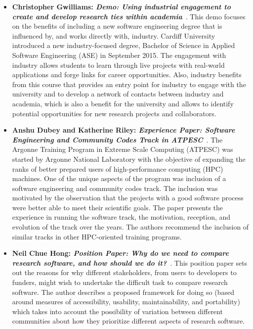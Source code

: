 \documentclass[11pt, oneside]{amsart}
\begin{document}
\begin{itemize}
\item \textbf{Christopher Gwilliams: \emph{Demo: Using industrial engagement to
create and develop research ties within academia}}~\cite{Gwilliams:2016ws}.
This demo focuses on the benefits of including a  new  software engineering
degree that is influenced by, and works directly with,
industry.  Cardiff  University  introduced  a  new  industry-focused  degree,
Bachelor of Science in Applied Software Engineering (ASE) in September
2015. The engagement with industry allows students to learn through live
projects  with  real-world  applications and forge links for career opportunities.
Also, industry benefits from this course that provides an entry point for industry
to engage with the university and to develop a network of contacts between industry
and academia, which is also a benefit for the university and allows to identify
potential opportunities for new research projects and collaborators.

\item \textbf{Anshu Dubey and Katherine Riley: \emph{Experience Paper: Software
Engineering and Community Codes Track in ATPESC}}~\cite{Dubey1:2016ws}.
The Argonne Training Program in Extreme Scale
Computing (ATPESC) was started by Argonne National Laboratory with the objective
of expanding the ranks of better prepared users of high-performance computing (HPC) machines.
One of the unique aspects of the program was inclusion of a
software engineering and community codes track. The inclusion
was motivated by the observation that the projects with a good
software process were better able to meet their scientific goals.
The paper presents the experience in running the software
track, the motivation, reception, and evolution of the track over the years.
The authors recommend the inclusion of similar tracks in other HPC-oriented training programs.

\item \textbf{Neil Chue Hong: \emph{Position Paper: Why do we need to compare
research software, and how should we do it?}}~\cite{ChueHong:2016ws}.
This position paper sets out the reasons for why different stakeholders,
from users to developers to funders, might wish to undertake the difficult task
to compare research software. The author describes a proposed framework for doing
so (based around measures of accessibility, usability, maintainability, and
portability) which takes into account the possibility of variation between
different communities about how they prioritize different aspects of research software.


\end{itemize}
\end{document}
